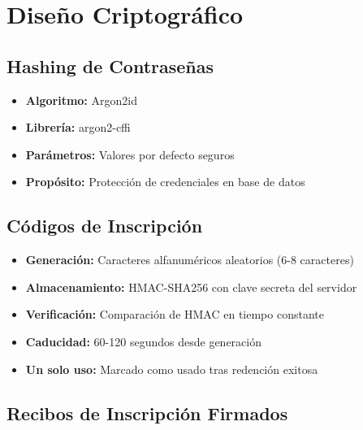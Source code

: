 \documentclass[12pt,a4paper]{article}
\begin{document}
\section{Diseño Criptográfico}

\subsection{Hashing de Contraseñas}

\begin{itemize}[leftmargin=*]
    \item \textbf{Algoritmo:} Argon2id
    \item \textbf{Librería:} argon2-cffi
    \item \textbf{Parámetros:} Valores por defecto seguros
    \item \textbf{Propósito:} Protección de credenciales en base de datos
\end{itemize}

\subsection{Códigos de Inscripción}

\begin{itemize}[leftmargin=*]
    \item \textbf{Generación:} Caracteres alfanuméricos aleatorios (6-8 caracteres)
    \item \textbf{Almacenamiento:} HMAC-SHA256 con clave secreta del servidor
    \item \textbf{Verificación:} Comparación de HMAC en tiempo constante
    \item \textbf{Caducidad:} 60-120 segundos desde generación
    \item \textbf{Un solo uso:} Marcado como usado tras redención exitosa
\end{itemize}

\subsection{Recibos de Inscripción Firmados}
\end{document}
